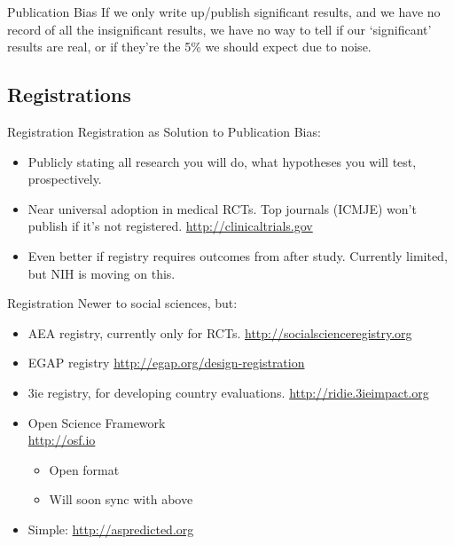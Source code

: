 \documentclass{beamer}
\begin{document}
\begin {frame}{Publication Bias}
If we only write up/publish significant results, and we have no record of all the insignificant results, we have no way to tell if our `significant' results are real, or if they're the 5\% we should expect due to noise.
\end{frame}

\subsection*{Registrations}
\begin{frame}{Registration}
Registration as Solution to Publication Bias:
 \begin{itemize}
  \item
   Publicly stating all research you will do, what hypotheses you will test, prospectively.
  \item
   Near universal adoption in medical RCTs. Top journals (ICMJE) won't publish if it's not registered. \url{http://clinicaltrials.gov}
  \item
   Even better if registry requires outcomes from after study. Currently limited, but NIH is moving on this.
\end{itemize}
\end{frame}

\begin{frame}{Registration}
 Newer to social sciences, but:
   \begin{itemize}[<.->]
   \item
   	AEA registry, currently only for RCTs. \url{http://socialscienceregistry.org}
   \item
    EGAP registry \url{http://egap.org/design-registration}
   \item 
    3ie registry, for developing country evaluations. \url{http://ridie.3ieimpact.org}
   \item
   	Open Science Framework\\ \url{http://osf.io}
   	\begin{itemize}
   	\item
   	Open format
   	\item
   	Will soon sync with above
   	\end{itemize}
   	\item Simple: \url{http://aspredicted.org}
   \end{itemize}
 
\end{frame}
\end{document}
